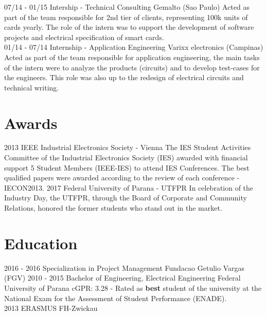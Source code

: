 \documentclass[]{friggeri-cv}
\begin{document}
\begin{entrylist}
    \entry
    {07/14 - 01/15}
    {Intership - Technical Consulting}
    {\normalsize{Gemalto (Sao Paulo)}}
    {Acted as part of the team responsible for 2nd tier of clients, representing 100k units of cards yearly. The role of the intern was to support the development of software projects and electrical specification of smart cards. \\}
    \entry
    {01/14 - 07/14}
    {Internship - Application Engineering}
    {\normalsize{Varixx electronics (Campinas)}}
    {Acted as part of the team responsible for application engineering, the main tasks of the intern were to analyze the products (circuits) and to develop test-cases for the engineers. This role was also up to the redesign of electrical circuits and technical writing.}
\end{entrylist}

\section{Awards}
\begin{entrylist}
 
  \entry
    {2013}
    {IEEE Industrial Electronics Society - Vienna}
    {}
    {The IES Student Activities Committee of the Industrial Electronics Society (IES) awarded with financial support 5 Student Members (IEEE-IES) to attend IES Conferences. The best qualified papers were awarded according to the review of each conference - IECON2013.}
    \entry
    {2017}
    {Federal University of Parana - UTFPR}
    {}
    {In celebration of the Industry Day, the UTFPR, through the Board of Corporate and Community Relations, honored the former students who stand out in the market.}
\end{entrylist}

\section{Education}
\begin{entrylist}
  \entry
    {2016 - 2016}
    {Specialization in Project Management}
    {Fundacao Getulio Vargas (FGV)}
    {}
  \entry
    {2010 - 2015}
    {Bachelor of Engineering, Electrical Engineering}
    {Federal University of Parana}
    {cGPR: 3.28 - Rated as \textbf{best} student of the university at the National Exam for the Assessment of Student Performance (ENADE). \\}
  \entry
    {2013}
    {ERASMUS}
    {FH-Zwickau}
    {%
    }
\end{entrylist}
\end{document}
